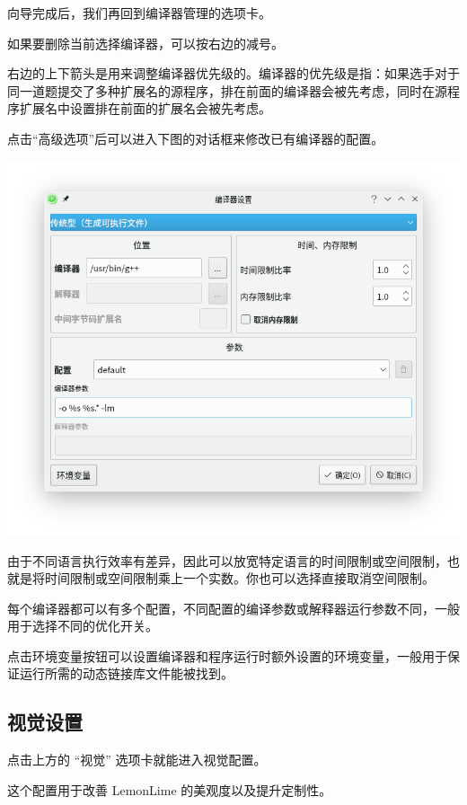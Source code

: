 \documentclass[UTF-8]{ctexart}
\begin{document}
				向导完成后，我们再回到编译器管理的选项卡。

				如果要删除当前选择编译器，可以按右边的减号。

				右边的上下箭头是用来调整编译器优先级的。编译器的优先级是指：如果选手对于同一道题提交了多种扩展名的源程序，排在前面的编译器会被先考虑，同时在源程序扩展名中设置排在前面的扩展名会被先考虑。

				点击“高级选项”后可以进入下图的对话框来修改已有编译器的配置。

				\begin{center}
				\includegraphics[scale=0.7]{pics/compilersettings2.png}
				\end{center}

				由于不同语言执行效率有差异，因此可以放宽特定语言的时间限制或空间限制，也就是将时间限制或空间限制乘上一个实数。你也可以选择直接取消空间限制。

				每个编译器都可以有多个配置，不同配置的编译参数或解释器运行参数不同，一般用于选择不同的优化开关。

				点击环境变量按钮可以设置编译器和程序运行时额外设置的环境变量，一般用于保证运行所需的动态链接库文件能被找到。


			\subsection{视觉设置}

				点击上方的 “视觉” 选项卡就能进入视觉配置。

				这个配置用于改善 LemonLime 的美观度以及提升定制性。
\end{document}
